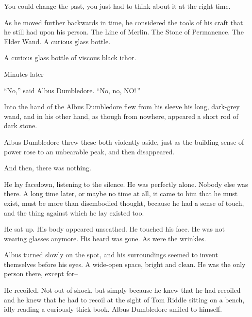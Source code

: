 You could change the past, you just had to think about it at the right time.

As he moved further backwards in time, he considered the tools of his craft that he still had upon his person. The Line of Merlin. The Stone of Permanence. The Elder Wand. A curious glass bottle.

A curious glass bottle of viscous black ichor.
\simpleline

Minutes later

“No,” said Albus Dumbledore. “No, no, NO! ”

Into the hand of the Albus Dumbledore flew from his sleeve his long, dark-grey wand, and in his other hand, as though from nowhere, appeared a short rod of dark stone.

Albus Dumbledore threw these both violently aside, just as the building sense of power rose to an unbearable peak, and then disappeared.

And then, there was nothing.

He lay facedown, listening to the silence. He was perfectly alone. Nobody else was there. A long time later, or maybe no time at all, it came to him that he must exist, must be more than disembodied thought, because he had a sense of touch, and the thing against which he lay existed too.

He sat up. His body appeared unscathed. He touched his face. He was not wearing glasses anymore. His beard was gone. As were the wrinkles.

Albus turned slowly on the spot, and his surroundings seemed to invent themselves before his eyes. A wide-open space, bright and clean. He was the only person there, except for–

He recoiled. Not out of shock, but simply because he knew that he had recoiled and he knew that he had to recoil at the sight of Tom Riddle sitting on a bench, idly reading a curiously thick book. Albus Dumbledore smiled to himself.


